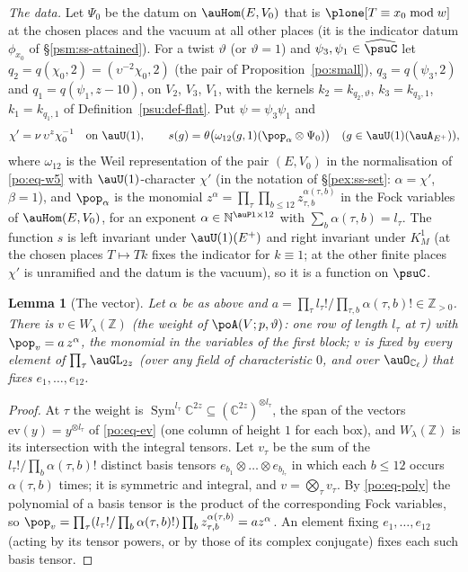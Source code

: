 \documentclass[10pt]{amsart}
\newtheorem{lemma}[theorem]{Lemma}
\theoremstyle{definition}
\theoremstyle{remark}
\newcommand{\C}{\mathbb C}
\newcommand{\N}{\mathbb N}
\newcommand{\Z}{\mathbb Z}
\begin{document}
\emph{The data.} Let $\Psi_0$ be the datum on $\auHom(E,V_0)$ that is $\plone[T\equiv x_0\bmod w]$ at
the chosen places and the vacuum at all other places (it is the indicator datum $\phi_{x_0}$ of
\S\ref{psm:ss-attained}). For a twist $\vartheta$ (or $\vartheta=1$) and $\psi_3,\psi_1\in\widehat\psuC$
let $q_2=q(\chi_0,2)=(\upsilon^{-2}\chi_0,2)$ (the pair of Proposition~\ref{po:small}), $q_3=q(\psi_3,2)$
and $q_1=q(\psi_1,z-10)$, on $V_2$, $V_3$, $V_1$, with the kernels $k_2=k_{q_2,\vartheta}$,
$k_3=k_{q_3,1}$, $k_1=k_{q_1,1}$ of Definition~\ref{psu:def-flat}. Put $\psi=\psi_3\psi_1$ and
\[
\chi'=\nu\,\upsilon^{z}\chi_0^{-1}\quad\text{on }\auU(1),\qquad s(g)=\theta\bigl(\omega_{12}(g,1)(\pop_\alpha
\otimes\Psi_0)\bigr)\quad(g\in\auU(1)(\auA_{E^+})),
\]
where $\omega_{12}$ is the Weil representation of the pair $(E,V_0)$ in the normalisation of
\eqref{po:eq-w5} with $\auU(1)$-character $\chi'$ (in the notation of \S\ref{pex:ss-set}: $\alpha=\chi'$,
$\beta=1$), and $\pop_\alpha$ is the monomial $z^\alpha=\prod_{\tau}\prod_{b\le12}z_{\tau,b}^{\alpha(\tau,b)}$
in the Fock variables of $\auHom(E,V_0)$, for an exponent $\alpha\in\N^{\auPl\times12}$ with
$\sum_b\alpha(\tau,b)=l_\tau$. The function $s$ is left invariant under $\auU(1)(E^+)$ and right
invariant under $K^1_M$ (at the chosen places $T\mapsto Tk$ fixes the indicator for $k\equiv1$; at the
other finite places $\chi'$ is unramified and the datum is the vacuum), so it is a function on
$\psuC$.

\begin{lemma}[The vector]\label{psu:vector}
Let $\alpha$ be as above and $a=\prod_\tau l_\tau!/\prod_{\tau,b}\alpha(\tau,b)!\in\Z_{>0}$. There is
$v\in W_\lambda(\Z)$ (the weight of $\poA(V;p,\vartheta)$: one row of length $l_\tau$ at $\tau$) with
$\pop_v=a\,z^\alpha$, the monomial in the variables of the first block; $v$ is fixed by every element of
$\prod_\tau\auGL_{2z}$ (over any field of characteristic $0$, and over $\auO_{\C_\ell}$) that fixes
$e_1,\dots,e_{12}$.
\end{lemma}
\begin{proof}
At $\tau$ the weight is $\operatorname{Sym}^{l_\tau}\C^{2z}\subseteq(\C^{2z})^{\otimes l_\tau}$, the span of
the vectors $\mathrm{ev}(y)=y^{\otimes l_\tau}$ of \eqref{po:eq-ev} (one column of height $1$ for each
box), and $W_\lambda(\Z)$ is its intersection with the integral tensors. Let $v_\tau$ be the sum of
the $l_\tau!/\prod_b\alpha(\tau,b)!$ distinct basis tensors $e_{b_1}\otimes\dots\otimes e_{b_{l_\tau}}$ in
which each $b\le12$ occurs $\alpha(\tau,b)$ times; it is symmetric and integral, and $v=\bigotimes_\tau
v_\tau$. By \eqref{po:eq-poly} the polynomial of a basis tensor is the product of the corresponding
Fock variables, so $\pop_v=\prod_\tau(l_\tau!/\prod_b\alpha(\tau,b)!)\prod_bz_{\tau,b}^{\alpha(\tau,b)}=
az^\alpha$. An element fixing $e_1,\dots,e_{12}$ (acting by its tensor powers, or by those of its
complex conjugate) fixes each such basis tensor.
\end{proof}
\end{document}

